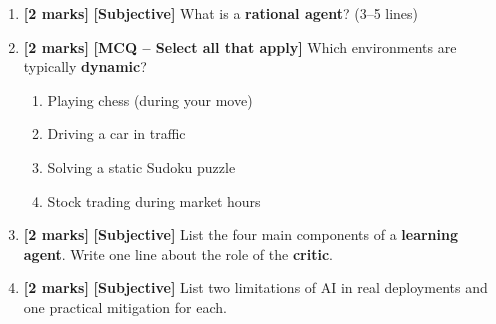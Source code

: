 \documentclass[11pt,a4paper]{article}
\newcommand{\EMarks}{\textbf{[2 marks]} }
\begin{document}
\begin{enumerate}[label=\textbf{E\arabic*.}, leftmargin=*]
  \item \EMarks \textbf{[Subjective]} What is a \textbf{rational agent}? (3--5 lines)

  \item \EMarks \textbf{[MCQ -- Select all that apply]} Which environments are typically \textbf{dynamic}?
    \begin{enumerate}[label=(\Alph*), leftmargin=*]
      \item Playing chess (during your move)
      \item Driving a car in traffic
      \item Solving a static Sudoku puzzle
      \item Stock trading during market hours
    \end{enumerate}

  \item \EMarks \textbf{[Subjective]} List the four main components of a \textbf{learning agent}.
    Write one line about the role of the \textbf{critic}.

  \item \EMarks \textbf{[Subjective]} List two limitations of AI in real deployments and one practical mitigation for each.
\end{enumerate}
\end{document}
